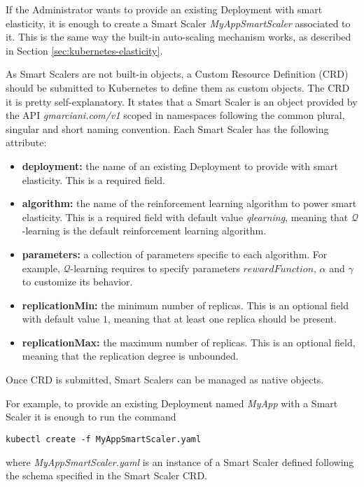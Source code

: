 If the Administrator wants to provide an existing Deployment with smart elasticity, it is enough to create a Smart Scaler \textit{MyAppSmartScaler} associated to it.
%
This is the same way the built-in auto-scaling mechanism works, as described in Section \ref{sec:kubernetes-elasticity}.

As Smart Scalers are not built-in objects, a Custom Resource Definition (CRD) should be submitted to Kubernetes to define them as custom objects.
%
%
The CRD it is pretty self-explanatory.
%
It states that a Smart Scaler is an object provided by the API \textit{gmarciani.com/v1} scoped in namespaces following the common plural, singular and short naming convention.
%
Each Smart Scaler has the following attribute:
%
\begin{itemize}
	
	\item \textbf{deployment:} the name of an existing Deployment to provide with smart elasticity.
	This is a required field.
	
	\item \textbf{algorithm:} the name of the reinforcement learning algorithm to power smart elasticity.
	This is a required field with default value \textit{qlearning}, meaning that $\mathcal{Q}$-learning is the default reinforcement learning algorithm.
	
	\item \textbf{parameters:} a collection of parameters specific to each algorithm. For example, $\mathcal{Q}$-learning requires to specify parameters $rewardFunction$, $\alpha$ and $\gamma$ to customize its behavior.
	
	\item \textbf{replicationMin:} the minimum number of replicas.
	This is an optional field with default value $1$, meaning that at least one replica should be present.
	
	\item \textbf{replicationMax:} the maximum number of replicas.
	This is an optional field, meaning that the replication degree is unbounded.
	 
\end{itemize}
%
Once CRD is submitted, Smart Scalers can be managed as native objects.

For example, to provide an existing Deployment named \textit{MyApp} with a Smart Scaler it is enough to run the command
%
\begin{verbatim}
kubectl create -f MyAppSmartScaler.yaml
\end{verbatim}
%
where \textit{MyAppSmartScaler.yaml} is an instance of a Smart Scaler defined following the schema specified in the Smart Scaler CRD.
%
%	


